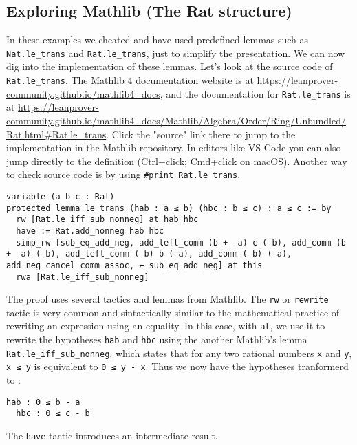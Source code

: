\subsection{Exploring Mathlib (The Rat structure)}
In these examples we cheated and have used predefined lemmas such as
\lstinline[language=lean]|Nat.le_trans| and
\lstinline[language=lean]|Rat.le_trans|, just to simplify the presentation.
We can now dig into the implementation of these lemmas.
Let's look at the source code of \lstinline[language=lean]|Rat.le_trans|.
The Mathlib 4 documentation website is at
\url{https://leanprover-community.github.io/mathlib4_docs}, and
the documentation for
\lstinline[language=lean]|Rat.le_trans| is at
\url{https://leanprover-community.github.io/mathlib4_docs/Mathlib/Algebra/Order/Ring/Unbundled/Rat.html#Rat.le_trans}.
Click the "source" link there to jump to the implementation in the Mathlib repository. In editors like
VS Code you can also jump directly to the definition (Ctrl+click; Cmd+click on macOS).
Another way to check source code is by using \lstinline[language=lean]|#print Rat.le_trans|.
\newpage
\begin{lstlisting}[language=lean]
variable (a b c : Rat)
protected lemma le_trans (hab : a ≤ b) (hbc : b ≤ c) : a ≤ c := by
  rw [Rat.le_iff_sub_nonneg] at hab hbc
  have := Rat.add_nonneg hab hbc
  simp_rw [sub_eq_add_neg, add_left_comm (b + -a) c (-b), add_comm (b + -a) (-b), add_left_comm (-b) b (-a), add_comm (-b) (-a), add_neg_cancel_comm_assoc, ← sub_eq_add_neg] at this
  rwa [Rat.le_iff_sub_nonneg]
\end{lstlisting}
The proof uses several tactics and lemmas from Mathlib.
The \lstinline[language=lean]|rw| or \lstinline[language=lean]|rewrite| tactic
is very common and sintactically similar to
the mathematical practice of rewriting an expression using an equality.
In this case, with \lstinline[language=lean]|at|, we use it to rewrite the
hypotheses \lstinline[language=lean]|hab|
and \lstinline[language=lean]|hbc|
using the another Mathlib's lemma \lstinline[language=lean]|Rat.le_iff_sub_nonneg|,
which states that for any two rational numbers \lstinline[language=lean]|x| and
\lstinline[language=lean]|y|, \lstinline[language=lean]|x ≤ y|
is equivalent to \lstinline[language=lean]|0 ≤ y - x|.
Thus we now have the hypotheses tranformerd to :
\begin{lstlisting}[language=lean]
  hab : 0 ≤ b - a
  hbc : 0 ≤ c - b
\end{lstlisting}
The \lstinline[language=lean]|have| tactic introduces an intermediate result.
